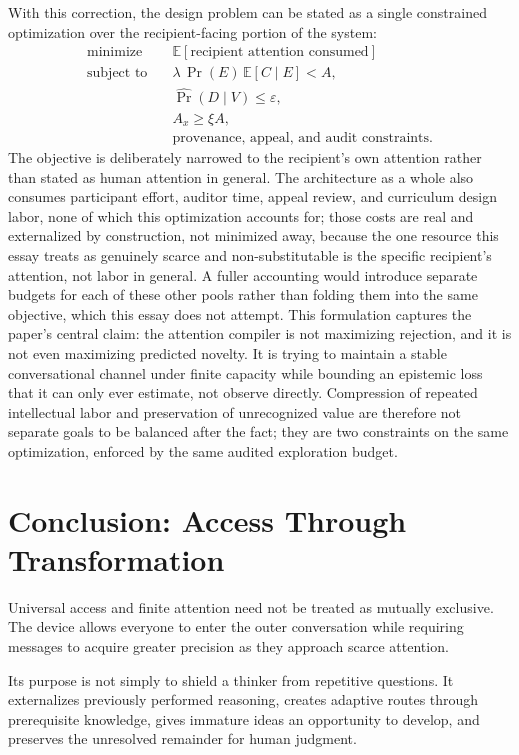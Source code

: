 \documentclass[11pt]{article}
\begin{document}
With this correction, the design problem can be stated as a single constrained optimization over the recipient-facing portion of the system:
\[
\begin{aligned}
\text{minimize} \quad & \mathbb{E}[\text{recipient attention consumed}] \\
\text{subject to} \quad & \lambda\,\Pr(E)\,\mathbb{E}[C \mid E] < A, \\
& \widehat{\Pr}(D \mid V) \leq \varepsilon, \\
& A_x \geq \xi A, \\
& \text{provenance, appeal, and audit constraints.}
\end{aligned}
\]
The objective is deliberately narrowed to the recipient's own attention rather than stated as human attention in general. The architecture as a whole also consumes participant effort, auditor time, appeal review, and curriculum design labor, none of which this optimization accounts for; those costs are real and externalized by construction, not minimized away, because the one resource this essay treats as genuinely scarce and non-substitutable is the specific recipient's attention, not labor in general. A fuller accounting would introduce separate budgets for each of these other pools rather than folding them into the same objective, which this essay does not attempt. This formulation captures the paper's central claim: the attention compiler is not maximizing rejection, and it is not even maximizing predicted novelty. It is trying to maintain a stable conversational channel under finite capacity while bounding an epistemic loss that it can only ever estimate, not observe directly. Compression of repeated intellectual labor and preservation of unrecognized value are therefore not separate goals to be balanced after the fact; they are two constraints on the same optimization, enforced by the same audited exploration budget.

\section{Conclusion: Access Through Transformation}

Universal access and finite attention need not be treated as mutually exclusive. The device allows everyone to enter the outer conversation while requiring messages to acquire greater precision as they approach scarce attention.

Its purpose is not simply to shield a thinker from repetitive questions. It externalizes previously performed reasoning, creates adaptive routes through prerequisite knowledge, gives immature ideas an opportunity to develop, and preserves the unresolved remainder for human judgment.
\end{document}
